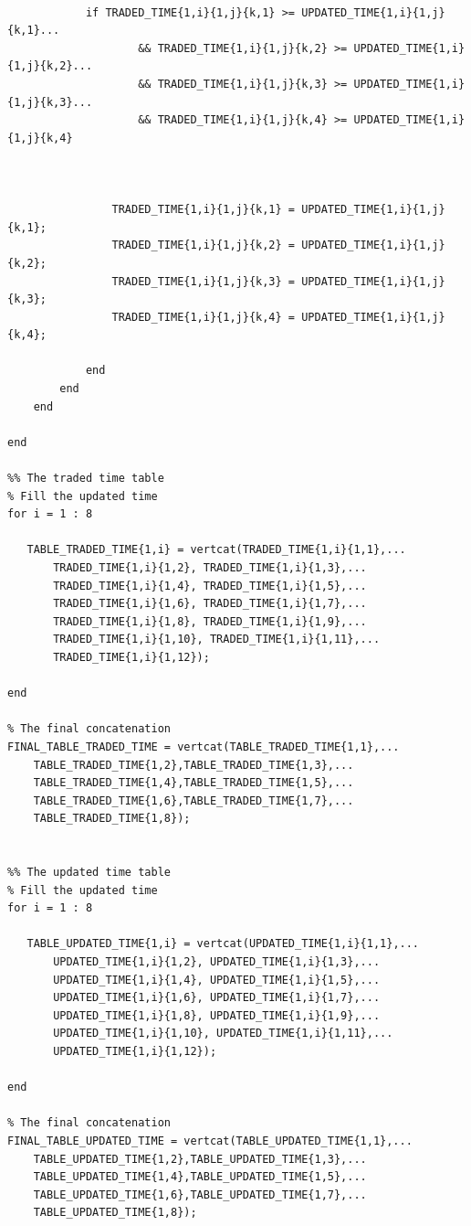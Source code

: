 \documentclass{DissertateUSU}
\begin{document}
\begin{verbatim}
                
            if TRADED_TIME{1,i}{1,j}{k,1} >= UPDATED_TIME{1,i}{1,j}{k,1}...
                    && TRADED_TIME{1,i}{1,j}{k,2} >= UPDATED_TIME{1,i}{1,j}{k,2}...
                    && TRADED_TIME{1,i}{1,j}{k,3} >= UPDATED_TIME{1,i}{1,j}{k,3}...
                    && TRADED_TIME{1,i}{1,j}{k,4} >= UPDATED_TIME{1,i}{1,j}{k,4}
                
                
                
                TRADED_TIME{1,i}{1,j}{k,1} = UPDATED_TIME{1,i}{1,j}{k,1};
                TRADED_TIME{1,i}{1,j}{k,2} = UPDATED_TIME{1,i}{1,j}{k,2};
                TRADED_TIME{1,i}{1,j}{k,3} = UPDATED_TIME{1,i}{1,j}{k,3};
                TRADED_TIME{1,i}{1,j}{k,4} = UPDATED_TIME{1,i}{1,j}{k,4};
                
            end
        end
    end
    
end

%% The traded time table
% Fill the updated time
for i = 1 : 8
    
   TABLE_TRADED_TIME{1,i} = vertcat(TRADED_TIME{1,i}{1,1},...
       TRADED_TIME{1,i}{1,2}, TRADED_TIME{1,i}{1,3},...
       TRADED_TIME{1,i}{1,4}, TRADED_TIME{1,i}{1,5},...
       TRADED_TIME{1,i}{1,6}, TRADED_TIME{1,i}{1,7},...
       TRADED_TIME{1,i}{1,8}, TRADED_TIME{1,i}{1,9},...
       TRADED_TIME{1,i}{1,10}, TRADED_TIME{1,i}{1,11},...
       TRADED_TIME{1,i}{1,12});
    
end

% The final concatenation
FINAL_TABLE_TRADED_TIME = vertcat(TABLE_TRADED_TIME{1,1},...
    TABLE_TRADED_TIME{1,2},TABLE_TRADED_TIME{1,3},...
    TABLE_TRADED_TIME{1,4},TABLE_TRADED_TIME{1,5},...
    TABLE_TRADED_TIME{1,6},TABLE_TRADED_TIME{1,7},...
    TABLE_TRADED_TIME{1,8});


%% The updated time table
% Fill the updated time
for i = 1 : 8
    
   TABLE_UPDATED_TIME{1,i} = vertcat(UPDATED_TIME{1,i}{1,1},...
       UPDATED_TIME{1,i}{1,2}, UPDATED_TIME{1,i}{1,3},...
       UPDATED_TIME{1,i}{1,4}, UPDATED_TIME{1,i}{1,5},...
       UPDATED_TIME{1,i}{1,6}, UPDATED_TIME{1,i}{1,7},...
       UPDATED_TIME{1,i}{1,8}, UPDATED_TIME{1,i}{1,9},...
       UPDATED_TIME{1,i}{1,10}, UPDATED_TIME{1,i}{1,11},...
       UPDATED_TIME{1,i}{1,12});
    
end

% The final concatenation
FINAL_TABLE_UPDATED_TIME = vertcat(TABLE_UPDATED_TIME{1,1},...
    TABLE_UPDATED_TIME{1,2},TABLE_UPDATED_TIME{1,3},...
    TABLE_UPDATED_TIME{1,4},TABLE_UPDATED_TIME{1,5},...
    TABLE_UPDATED_TIME{1,6},TABLE_UPDATED_TIME{1,7},...
    TABLE_UPDATED_TIME{1,8});


\end{verbatim}
\end{document}
